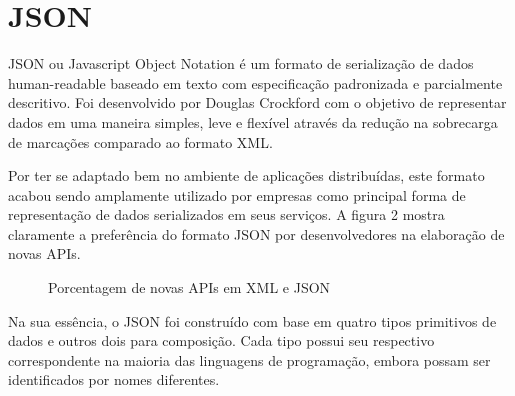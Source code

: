 \section{JSON}

JSON ou Javascript Object Notation é um formato de serialização de dados human-readable baseado em texto com especificação padronizada e parcialmente descritivo. Foi desenvolvido por Douglas Crockford com o objetivo de representar dados em uma maneira simples, leve e flexível através da redução na sobrecarga de marcações comparado ao formato XML.

Por ter se adaptado bem no ambiente de aplicações distribuídas, este formato acabou sendo amplamente utilizado por empresas como principal forma de representação de dados serializados em seus serviços. A figura 2 mostra claramente a preferência do formato JSON por desenvolvedores na elaboração de novas APIs. \cite{Duvander2013}

\begin{figure}[H]
  \centering
  \caption{Porcentagem de novas APIs em XML e JSON}
\end{figure}

Na sua essência, o JSON foi construído com base em quatro tipos primitivos de dados e outros dois para composição. Cada tipo possui seu respectivo correspondente na maioria das linguagens de programação, embora possam ser identificados por nomes diferentes. \cite{Droettboom2015}

